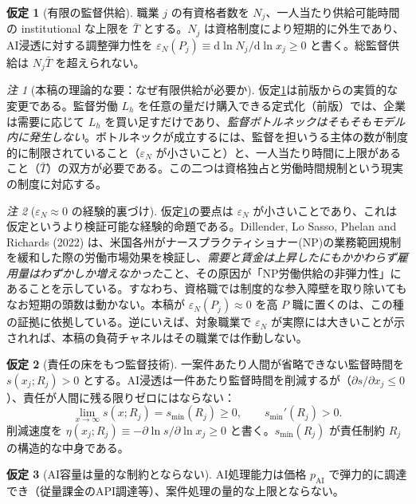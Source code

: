 \documentclass[11pt]{article}
\theoremstyle{plain}
\theoremstyle{definition}
\newtheorem{assm}{仮定}
\theoremstyle{remark}
\newtheorem*{rmk}{注}
\begin{document}
\begin{assm}[有限の監督供給]\label{a:capacity}
職業 $j$ の有資格者数を $N_j$、一人当たり供給可能時間の institutional な上限を $\bar T$ とする。$N_j$ は資格制度により短期的に外生であり、AI浸透に対する調整弾力性を $\varepsilon_N(P_j)\equiv \mathrm d\ln N_j/\mathrm d\ln x_j\ge0$ と書く。総監督供給は $N_j\bar T$ を超えられない。
\end{assm}

\begin{rmk}[本稿の理論的な要：なぜ有限供給が必要か]
仮定\ref{a:capacity}は前版からの実質的な変更である。監督労働 $L_h$ を任意の量だけ購入できる定式化（前版）では、企業は需要に応じて $L_h$ を買い足すだけであり、\emph{監督ボトルネックはそもそもモデル内に発生しない}。ボトルネックが成立するには、監督を担いうる主体の数が制度的に制限されていること（$\varepsilon_N$ が小さいこと）と、一人当たり時間に上限があること（$\bar T$）の双方が必要である。この二つは資格独占と労働時間規制という現実の制度に対応する。
\end{rmk}

\begin{rmk}[$\varepsilon_N\approx0$ の経験的裏づけ]\label{r:epsn}
仮定\ref{a:capacity}の要点は $\varepsilon_N$ が小さいことであり、これは仮定というより検証可能な経験的命題である。Dillender, Lo Sasso, Phelan and Richards (2022) は、米国各州がナースプラクティショナー(NP)の業務範囲規制を緩和した際の労働市場効果を検証し、\emph{需要と賃金は上昇したにもかかわらず雇用量はわずかしか増えなかった}こと、その原因が「NP労働供給の非弾力性」にあることを示している。すなわち、資格職では制度的な参入障壁を取り除いてもなお短期の頭数は動かない。本稿が $\varepsilon_N(P_j)\approx0$ を高 $P$ 職に置くのは、この種の証拠に依拠している。逆にいえば、対象職業で $\varepsilon_N$ が実際には大きいことが示されれば、本稿の負荷チャネルはその職業では作動しない。
\end{rmk}

\begin{assm}[責任の床をもつ監督技術]\label{a:tech}
一案件あたり人間が省略できない監督時間を $s(x_j;R_j)>0$ とする。AI浸透は一件あたり監督時間を削減するが（$\partial s/\partial x_j\le0$）、責任が人間に残る限りゼロにはならない：
\[
\lim_{x\to\infty}s(x;R_j)=s_{\min}(R_j)\ge0,\qquad s_{\min}'(R_j)>0 .
\]
削減速度を $\eta(x_j;R_j)\equiv-\partial\ln s/\partial\ln x_j\ge0$ と書く。$s_{\min}(R_j)$ が責任制約 $R_j$ の構造的な中身である。
\end{assm}

\begin{assm}[AI容量は量的な制約とならない]\label{a:ai}
AI処理能力は価格 $p_{\mathrm{AI}}$ で弾力的に調達でき（従量課金のAPI調達等）、案件処理の量的な上限とならない。
\end{assm}
\end{document}
